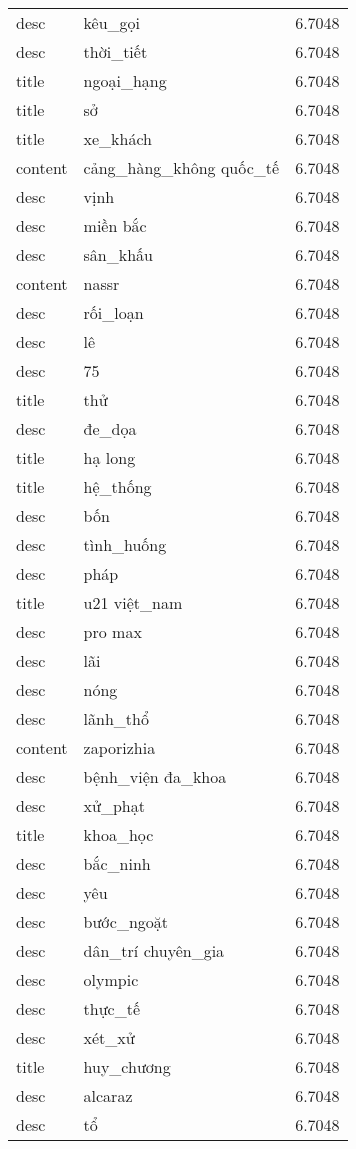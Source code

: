 \documentclass{article}
\begin{document}
\begin{tabular}{lll}
desc & kêu\_gọi & 6.7048\\
desc & thời\_tiết & 6.7048\\
title & ngoại\_hạng & 6.7048\\
title & sở & 6.7048\\
title & xe\_khách & 6.7048\\
content & cảng\_hàng\_không quốc\_tế & 6.7048\\
desc & vịnh & 6.7048\\
desc & miền bắc & 6.7048\\
desc & sân\_khấu & 6.7048\\
content & nassr & 6.7048\\
desc & rối\_loạn & 6.7048\\
desc & lê & 6.7048\\
desc & 75 & 6.7048\\
title & thử & 6.7048\\
desc & đe\_dọa & 6.7048\\
title & hạ long & 6.7048\\
title & hệ\_thống & 6.7048\\
desc & bốn & 6.7048\\
desc & tình\_huống & 6.7048\\
desc & pháp & 6.7048\\
title & u21 việt\_nam & 6.7048\\
desc & pro max & 6.7048\\
desc & lãi & 6.7048\\
desc & nóng & 6.7048\\
desc & lãnh\_thổ & 6.7048\\
content & zaporizhia & 6.7048\\
desc & bệnh\_viện đa\_khoa & 6.7048\\
desc & xử\_phạt & 6.7048\\
title & khoa\_học & 6.7048\\
desc & bắc\_ninh & 6.7048\\
desc & yêu & 6.7048\\
desc & bước\_ngoặt & 6.7048\\
desc & dân\_trí chuyên\_gia & 6.7048\\
desc & olympic & 6.7048\\
desc & thực\_tế & 6.7048\\
desc & xét\_xử & 6.7048\\
title & huy\_chương & 6.7048\\
desc & alcaraz & 6.7048\\
desc & tổ & 6.7048\\

\end{tabular}
\end{document}
